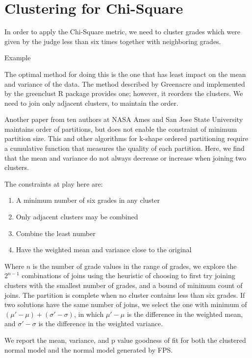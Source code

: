 \section{Clustering for Chi-Square}

In order to apply the Chi-Square metric, we need to cluster grades which
were given by the judge less than six times together with neighboring
grades.

Example

The optimal method for doing this is the one that has least impact on
the mean and variance of the data. The method described by
Greenacre \cite{Greenacre}
and implemented by the
greenclust \cite{greenclust}
R package provides one; however, it reorders the clusters.
We need to join only adjacent clusters, to maintain the order.

Another paper
\cite{partitioning}
from ten authors at NASA Ames and San Jose State University
maintains order of partitions, but does not enable the constraint of
minimum partition size. This and other algorithms for k-shape
ordered partitioning require a cumulative
function that measures the quality of each partition.
Here, we find that the mean and variance do not always decrease or
increase when joining two clusters.

The constraints at play here are:
\begin{enumerate}
\item{A minimum number of six grades in any cluster}
\item{Only adjacent clusters may be combined}
\item{Combine the least number}
\item{Have the weighted mean and variance close to the original}
\end{enumerate}

Where $n$ is the number of grade values in the range of grades,
we explore the $2^{n-1}$ combinations of joins using the heuristic
of choosing to first try joining clusters with the smallest number of grades,
and a bound of minimum count of joins. The partition
is complete when no cluster contains less than six grades. If two solutions
have the same number of joins, we select the one with minimum of
$(\mu' - \mu) + (\sigma' - \sigma)$, in which
$\mu' - \mu$ is
the difference in the weighted mean, and
$\sigma' - \sigma$ is
the difference in the weighted variance.

We report the mean, variance, and p value goodness of fit
for both the clustered normal model and the normal model generated by FPS.

